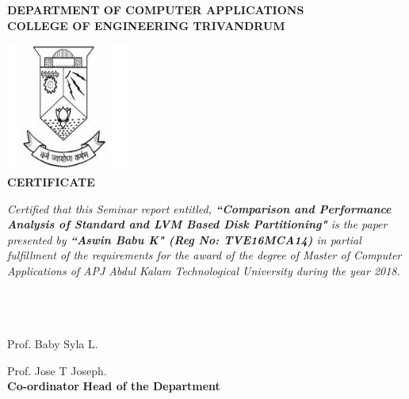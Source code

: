 \begin{titlepage}
\begin{center}
\textbf{DEPARTMENT OF COMPUTER APPLICATIONS}\\[0.5cm]
\textbf{ COLLEGE OF ENGINEERING TRIVANDRUM}\\
[0.5cm]
\vspace{1.2cm}

\includegraphics[width=0.30\textwidth]{./logo}\\
\vspace{0.8cm}
\textbf{CERTIFICATE}\\
\end{center}

\emph{Certified that this Seminar report entitled,
\textbf{``Comparison and Performance Analysis of Standard and LVM Based Disk
Partitioning"} is the paper presented by \textbf{``Aswin Babu K"
(Reg No: TVE16MCA14)} in partial fulfillment of the requirements for the award
of the degree of Master of Computer Applications of APJ Abdul Kalam
Technological University during the year 2018.}\\\\\\\\
\vspace{0.5cm}

Prof. Baby Syla L.
\hspace{9.5cm}

Prof. Jose T Joseph.\\ 

\hspace{3.9cm} \textbf{Co-ordinator}
\hspace{9.2cm}
\textbf{Head of the Department}

\end{titlepage}
